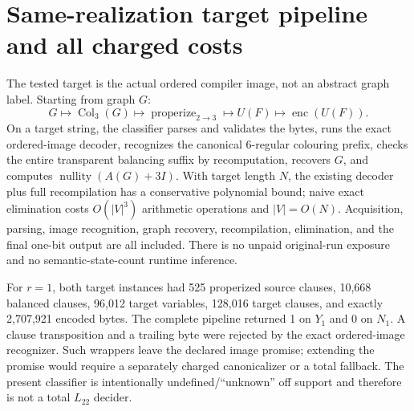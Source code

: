 \documentclass[11pt]{article}
\newcommand{\Ltwo}{L_{22}}
\newcommand{\nullity}{\operatorname{nullity}}
\begin{document}
\section{Same-realization target pipeline and all charged costs}
The tested target is the actual ordered compiler image, not an abstract graph
label.  Starting from graph $G$:
\[
 G\longmapsto \operatorname{Col}_3(G)
 \longmapsto \operatorname{properize}_{2\to3}
 \longmapsto U(F)\longmapsto \operatorname{enc}(U(F)).   \tag{6}
\]
On a target string, the classifier parses and validates the bytes, runs the
exact ordered-image decoder, recognizes the canonical 6-regular colouring
prefix, checks the entire transparent balancing suffix by recomputation,
recovers $G$, and computes $\nullity(A(G)+3I)$.  With target length $N$, the
existing decoder plus full recompilation has a conservative polynomial bound;
naive exact elimination costs $O(|V|^3)$ arithmetic operations and
$|V|=O(N)$.  Acquisition, parsing, image recognition, graph recovery,
recompilation, elimination, and the final one-bit output are all included.
There is no unpaid original-run exposure and no semantic-state-count runtime
inference.

For $r=1$, both target instances had 525 properized source clauses, 10,668
balanced clauses, 96,012 target variables, 128,016 target clauses, and exactly
2,707,921 encoded bytes.  The complete pipeline returned 1 on $Y_1$ and 0 on
$N_1$.  A clause transposition and a trailing byte were rejected by the exact
ordered-image recognizer.  Such wrappers leave the declared image promise;
extending the promise would require a separately charged canonicalizer or a
total fallback.  The present classifier is intentionally undefined/``unknown''
off support and therefore is not a total $\Ltwo$ decider.
\end{document}
